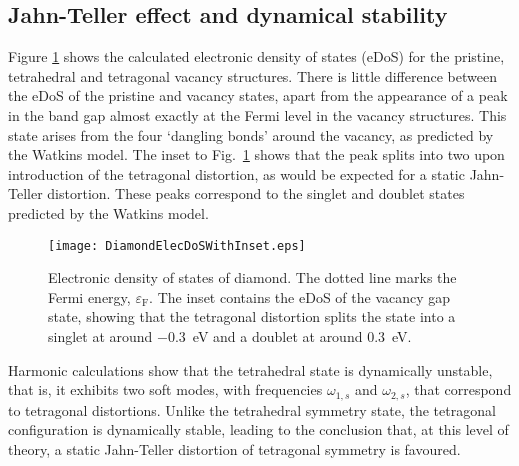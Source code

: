 \documentclass[aps,showpacs,prb,reprint,superscriptaddress,longbibliography]{revtex4-1}
\begin{document}
\subsection{Jahn-Teller effect and dynamical stability}

Figure \ref{fig:DiamondElecDoS} shows the calculated electronic
density of states (eDoS) for the pristine, tetrahedral and tetragonal
vacancy structures. There is little difference between the eDoS of the
pristine and vacancy states, apart from the appearance of a peak in
the band gap almost exactly at the Fermi level in the vacancy
structures. This state arises from the four `dangling bonds' around
the vacancy, as predicted by the Watkins model.  The inset to Fig.\
\ref{fig:DiamondElecDoS} shows that the peak splits into two upon
introduction of the tetragonal distortion, as would be expected for a
static Jahn-Teller distortion. These peaks correspond to the singlet
and doublet states predicted by the Watkins
model.\cite{watkins_lattice_1986}
\begin{figure}
\begin{center}
\texttt{[image: DiamondElecDoSWithInset.eps]}
\end{center}
\caption{Electronic density of states of diamond. The dotted line
  marks the Fermi energy, $\varepsilon_{\mathrm{F}}$. The inset contains the eDoS of the vacancy gap
  state, showing that the tetragonal distortion splits the state into a
  singlet at around $-0.3$~eV and a doublet at around $0.3$~eV.
} 
\label{fig:DiamondElecDoS}
\end{figure}
Harmonic calculations show that the tetrahedral state is dynamically
unstable, that is, it exhibits two soft modes, with frequencies
$\omega_{1,s}$ and $\omega_{2,s}$, that correspond to tetragonal
distortions.  Unlike the tetrahedral symmetry state, the tetragonal
configuration is dynamically stable, leading to the conclusion that,
at this level of theory, a static Jahn-Teller distortion of tetragonal
symmetry is favoured.
\end{document}
